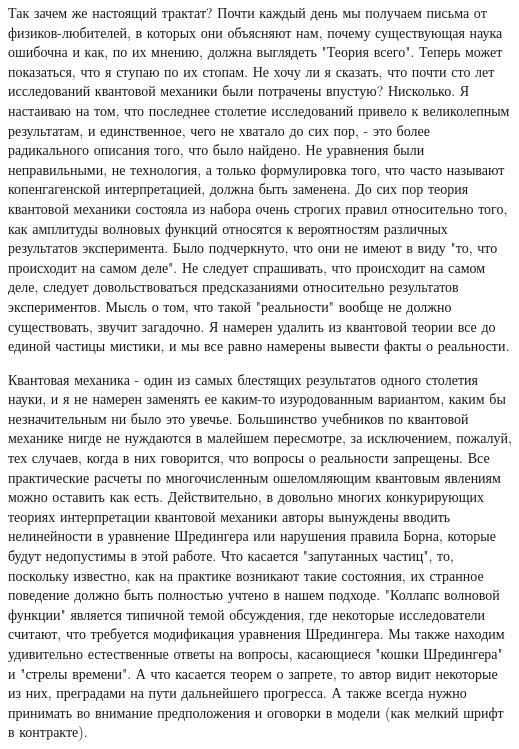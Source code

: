 \documentclass[main.tex]{subfiles}
\begin{document}
Так зачем же настоящий трактат? Почти каждый день мы получаем письма от физиков-любителей, в которых они объясняют нам, почему существующая наука ошибочна и как, по их мнению, должна выглядеть "Теория всего". Теперь может показаться, что я ступаю по их стопам. Не хочу ли я сказать, что почти сто лет исследований квантовой механики были потрачены впустую? Нисколько. Я настаиваю на том, что последнее столетие исследований привело к великолепным результатам, и единственное, чего не хватало до сих пор, - это более радикального описания того, что было найдено. Не уравнения были неправильными, не технология, а только формулировка того, что часто называют копенгагенской интерпретацией, должна быть заменена. До сих пор теория квантовой механики состояла из набора очень строгих правил относительно того, как амплитуды волновых функций относятся к вероятностям различных результатов эксперимента. Было подчеркнуто, что они не имеют в виду "то, что происходит на самом деле". Не следует спрашивать, что происходит на самом деле, следует довольствоваться предсказаниями относительно результатов экспериментов. Мысль о том, что такой "реальности" вообще не должно существовать, звучит загадочно. Я намерен удалить из квантовой теории все до единой частицы мистики, и мы все равно намерены вывести факты о реальности.

Квантовая механика - один из самых блестящих результатов одного столетия науки, и я не намерен заменять ее каким-то изуродованным вариантом, каким бы незначительным ни было это увечье. Большинство учебников по квантовой механике нигде не нуждаются в малейшем пересмотре, за исключением, пожалуй, тех случаев, когда в них говорится, что вопросы о реальности запрещены. Все практические расчеты по многочисленным ошеломляющим квантовым явлениям можно оставить как есть. Действительно, в довольно многих конкурирующих теориях интерпретации квантовой механики авторы вынуждены вводить нелинейности в уравнение Шредингера или нарушения правила Борна, которые будут недопустимы в этой работе. Что касается "запутанных частиц", то, поскольку известно, как на практике возникают такие состояния, их странное поведение должно быть полностью учтено в нашем подходе. "Коллапс волновой функции" является типичной темой обсуждения, где некоторые исследователи считают, что требуется модификация уравнения Шредингера. Мы также находим удивительно естественные ответы на вопросы, касающиеся "кошки Шредингера" и "стрелы времени". А что касается теорем о запрете, то автор видит некоторые из них, преградами на пути дальнейшего прогресса. А также всегда нужно принимать во внимание предположения и оговорки в модели (как мелкий шрифт в контракте).  
\end{document}
